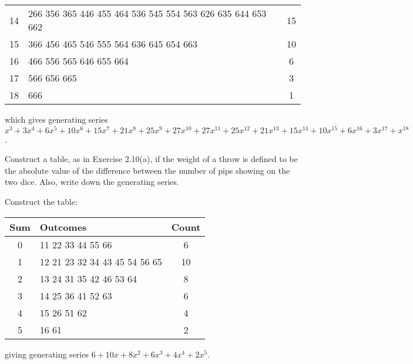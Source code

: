 \documentclass[class=math239,notes]{agony}
\begin{document}
\begin{enumerate}
\begin{sol}
\begin{center}
\begin{tabular}{c|l|c}
              14  & 266 356 365 446 455 464 536 545 554 563 626 635 644 653 662                                                 & 15    \\
              15  & 366 456 465 546 555 564 636 645 654 663                                                                     & 10    \\
              16  & 466 556 565 646 655 664                                                                                     & 6     \\
              17  & 566 656 665                                                                                                 & 3     \\
              18  & 666                                                                                                         & 1
            \end{tabular}
          \end{center}
          which gives generating series $x^3 + 3x^4 + 6x^5 + 10x^6 + 15x^7 + 21x^8 + 25x^9 + 27x^{10} + 27x^{11} + 25x^{12} + 21x^{13} + 15x^{14} + 10x^{15} + 6x^{16} + 3x^{17} + x^{18}$.
        \end{sol}
\end{enumerate}

\begin{xca}
  Construct a table, as in Exercise 2.10(a),
  if the weight of a throw is defined to be
  the absolute value of the difference between
  the number of pips showing on the two dice.
  Also, write down the generating series.
\end{xca}
\begin{sol}
  Construct the table:
  \begin{center}
    \begin{tabular}{c|l|c}
      Sum & Outcomes                      & Count \\ \hline
      0   & 11 22 33 44 55 66             & 6     \\
      1   & 12 21 23 32 34 43 45 54 56 65 & 10    \\
      2   & 13 24 31 35 42 46 53 64       & 8     \\
      3   & 14 25 36 41 52 63             & 6     \\
      4   & 15 26 51 62                   & 4     \\
      5   & 16 61                         & 2
    \end{tabular}
  \end{center}
  giving generating series $6 + 10x + 8x^2 + 6x^3 + 4x^4 + 2x^5$.
\end{sol}
\end{document}

